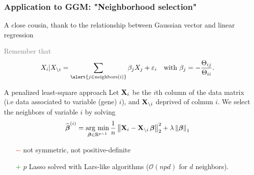 \begin{frame}
  \frametitle{Application to GGM: "Neighborhood selection"} 

  A close cousin, thank to the relationship between Gaussian vector and linear regression
  
  \textcolor{gray}{
  Remember that
  \begin{equation*}
    X_i | X_{ \setminus i} = \sum_{\alert{j \in \text{neighbors}(i)}} \beta_j X_j + \varepsilon_i
    \quad         \text{with         }         \beta_j         =
    -\frac{\Theta_{ij}}{\Theta_{ii}}.
  \end{equation*}
  }
  
  \begin{block}{A penalized least-square approach}
    Let $\mathbf{X}_i$ be the $i$th column of the data matrix (i.e data associated to variable (gene) $i$), and $\mathbf{X}_{\backslash i}$ deprived of colmun $i$. We select the neighbors of variable $i$ by solving
    \begin{equation*}
      \widehat{\boldsymbol\beta}^{(i)} = \mathop{\mathrm{arg\ min}}_{\boldsymbol\beta \in \mathbb{R}^{p-1} }
      \frac{1}{n} \left\| \mathbf{X}_i - \mathbf{X}_{\backslash i} \,
        {\boldsymbol\beta} \right\|_2^2 + \lambda \left\| {\boldsymbol\beta} \right\|_{1}
    \end{equation*}

    \begin{itemize}
    \item[\textcolor{red}{$-$}] not symmetric, not positive-definite
    \item[\textcolor{green}{$+$}] $p$
      Lasso solved with Lars-like algorithms ($\mathcal{O}(npd)$ for $d$ neighbors).
    \end{itemize}

\end{block}

\end{frame}

